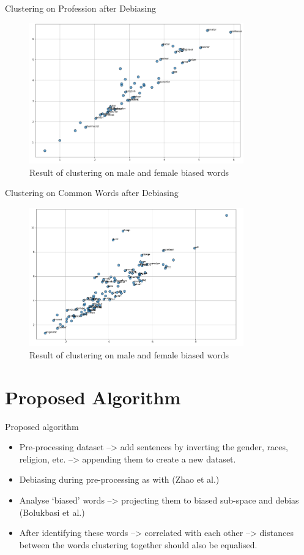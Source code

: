 \documentclass{beamer}
\begin{document}
	
	\begin{frame}{Clustering on Profession after Debiasing}
		\vspace{3mm}
		\begin{figure}[H]
			\centerline{\includegraphics[width=25em]{debiased_profession.png}}
			\caption{Result of clustering on male and female biased words}
			\label{profession-debias-fig}
		\end{figure}
	\end{frame}
	
	\begin{frame}{Clustering on Common Words after Debiasing}
		\vspace{3mm}
		\begin{figure}[H]
			\centerline{\includegraphics[width=25em]{debiased_misc.png}}
			\caption{Result of clustering on male and female biased words}
			\label{common-debias-fig}
		\end{figure}
	\end{frame}

	\section{Proposed Algorithm}
		\begin{frame}{Proposed algorithm}
			\begin{itemize}
				\item Pre-processing dataset --> add sentences by inverting the gender, races, religion, etc. --> appending them to create a new dataset.
				\item Debiasing during pre-processing as with (Zhao et al.)
				\item  Analyse `biased' words --> projecting them to biased sub-space and debias (Bolukbasi et al.)
				\item After identifying these words --> correlated with each other --> distances between the words clustering together should also be equalised.
			\end{itemize}
		\end{frame}
	
\end{document}
